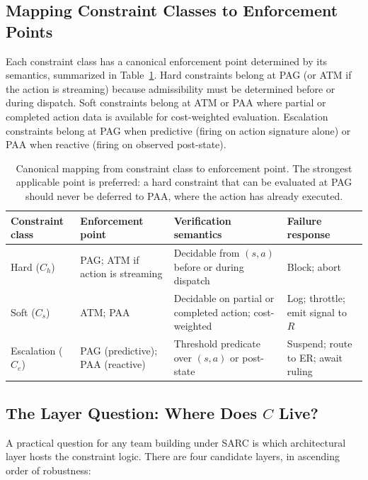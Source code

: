 \documentclass[11pt,a4paper]{article}
\theoremstyle{remark}
\begin{document}
\subsection{Mapping Constraint Classes to Enforcement Points}

Each constraint class has a canonical enforcement point determined by its semantics, summarized in Table~\ref{tab:mapping}. Hard constraints belong at PAG (or ATM if the action is streaming) because admissibility must be determined before or during dispatch. Soft constraints belong at ATM or PAA where partial or completed action data is available for cost-weighted evaluation. Escalation constraints belong at PAG when predictive (firing on action signature alone) or PAA when reactive (firing on observed post-state).

\begin{table}[h]
\centering\small
\begin{tabularx}{\textwidth}{@{}lXXX@{}}
\toprule
\textbf{Constraint class} & \textbf{Enforcement point} & \textbf{Verification semantics} & \textbf{Failure response} \\
\midrule
Hard ($C_h$) & PAG; ATM if action is streaming & Decidable from $(s,a)$ before or during dispatch & Block; abort \\
Soft ($C_s$) & ATM; PAA & Decidable on partial or completed action; cost-weighted & Log; throttle; emit signal to $R$ \\
Escalation ($C_e$) & PAG (predictive); PAA (reactive) & Threshold predicate over $(s, a)$ or post-state & Suspend; route to ER; await ruling \\
\bottomrule
\end{tabularx}
\caption{Canonical mapping from constraint class to enforcement point. The strongest applicable point is preferred: a hard constraint that can be evaluated at PAG should never be deferred to PAA, where the action has already executed.}
\label{tab:mapping}
\end{table}

\subsection{The Layer Question: Where Does $C$ Live?}

A practical question for any team building under SARC is which architectural layer hosts the constraint logic. There are four candidate layers, in ascending order of robustness:
\end{document}
